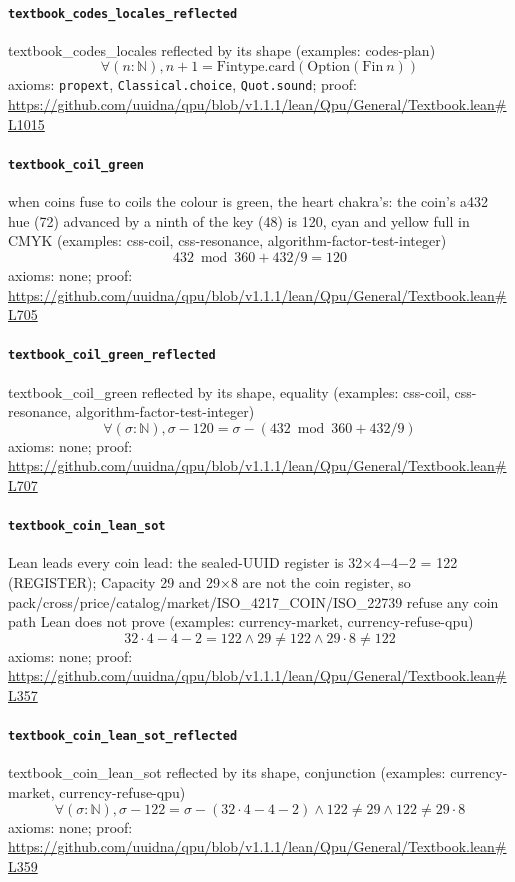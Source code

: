 \documentclass[11pt]{article}
\begin{document}
\paragraph{\texttt{textbook\_codes\_locales\_reflected}}
textbook\_codes\_locales reflected by its shape (examples: codes-plan)
\[ \forall (n : \mathbb{N}), n + 1 = \mathrm{Fintype.card} (\mathrm{Option} (\mathrm{Fin}\ n)) \]
\noindent axioms: \texttt{propext}, \texttt{Classical.choice}, \texttt{Quot.sound}; proof: \url{https://github.com/uuidna/qpu/blob/v1.1.1/lean/Qpu/General/Textbook.lean\#L1015}

\paragraph{\texttt{textbook\_coil\_green}}
when coins fuse to coils the colour is green, the heart chakra's: the coin's a432 hue (72) advanced by a ninth of the key (48) is 120, cyan and yellow full in CMYK (examples: css-coil, css-resonance, algorithm-factor-test-integer)
\[ 432 \bmod 360 + 432 / 9 = 120 \]
\noindent axioms: none; proof: \url{https://github.com/uuidna/qpu/blob/v1.1.1/lean/Qpu/General/Textbook.lean\#L705}

\paragraph{\texttt{textbook\_coil\_green\_reflected}}
textbook\_coil\_green reflected by its shape, equality (examples: css-coil, css-resonance, algorithm-factor-test-integer)
\[ \forall (\sigma : \mathbb{N}), \sigma - 120 = \sigma - (432 \bmod 360 + 432 / 9) \]
\noindent axioms: none; proof: \url{https://github.com/uuidna/qpu/blob/v1.1.1/lean/Qpu/General/Textbook.lean\#L707}

\paragraph{\texttt{textbook\_coin\_lean\_sot}}
Lean leads every coin lead: the sealed-UUID register is 32×4−4−2 = 122 (REGISTER); Capacity 29 and 29×8 are not the coin register, so pack/cross/price/catalog/market/ISO\_4217\_COIN/ISO\_22739 refuse any coin path Lean does not prove (examples: currency-market, currency-refuse-qpu)
\[ 32 \cdot 4 - 4 - 2 = 122 \land 29 \ne 122 \land 29 \cdot 8 \ne 122 \]
\noindent axioms: none; proof: \url{https://github.com/uuidna/qpu/blob/v1.1.1/lean/Qpu/General/Textbook.lean\#L357}

\paragraph{\texttt{textbook\_coin\_lean\_sot\_reflected}}
textbook\_coin\_lean\_sot reflected by its shape, conjunction (examples: currency-market, currency-refuse-qpu)
\[ \forall (\sigma : \mathbb{N}), \sigma - 122 = \sigma - (32 \cdot 4 - 4 - 2) \land 122 \ne 29 \land 122 \ne 29 \cdot 8 \]
\noindent axioms: none; proof: \url{https://github.com/uuidna/qpu/blob/v1.1.1/lean/Qpu/General/Textbook.lean\#L359}
\end{document}

